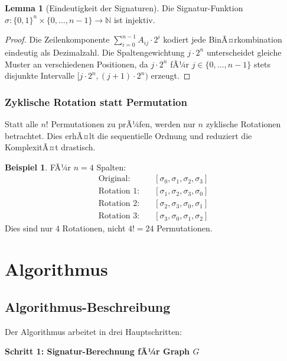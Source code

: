 ﻿\documentclass[a4paper,12pt]{article}
\theoremstyle{definition}
\newtheorem{beispiel}{Beispiel}
\newtheorem{lemma}{Lemma}
\begin{document}
\begin{lemma}[Eindeutigkeit der Signaturen]
	Die Signatur-Funktion $\sigma: \{0,1\}^n \times \{0,\ldots,n-1\} \to \mathbb{N}$ ist injektiv.
\end{lemma}

\begin{proof}
	Die Zeilenkomponente $\sum_{i=0}^{n-1} A_{ij} \cdot 2^i$ kodiert jede BinÃ¤rkombination eindeutig als Dezimalzahl. Die Spaltengewichtung $j \cdot 2^n$ unterscheidet gleiche Muster an verschiedenen Positionen, da $j \cdot 2^n$ fÃ¼r $j \in \{0,\ldots,n-1\}$ stets disjunkte Intervalle $[j \cdot 2^n, (j+1) \cdot 2^n)$ erzeugt.
\end{proof}

\subsubsection{Zyklische Rotation statt Permutation}

Statt alle $n!$ Permutationen zu prÃ¼fen, werden nur $n$ zyklische Rotationen betrachtet. Dies erhÃ¤lt die sequentielle Ordnung und reduziert die KomplexitÃ¤t drastisch.

\begin{beispiel}
	FÃ¼r $n=4$ Spalten:
	\begin{align*}
		\text{Original:} & \quad [\sigma_0, \sigma_1, \sigma_2, \sigma_3] \\
		\text{Rotation 1:} & \quad [\sigma_1, \sigma_2, \sigma_3, \sigma_0] \\
		\text{Rotation 2:} & \quad [\sigma_2, \sigma_3, \sigma_0, \sigma_1] \\
		\text{Rotation 3:} & \quad [\sigma_3, \sigma_0, \sigma_1, \sigma_2]
	\end{align*}
	Dies sind nur $4$ Rotationen, nicht $4! = 24$ Permutationen.
\end{beispiel}

\section{Algorithmus}

\subsection{Algorithmus-Beschreibung}

Der Algorithmus arbeitet in drei Hauptschritten:

\textbf{Schritt 1: Signatur-Berechnung fÃ¼r Graph $G$}
\end{document}
